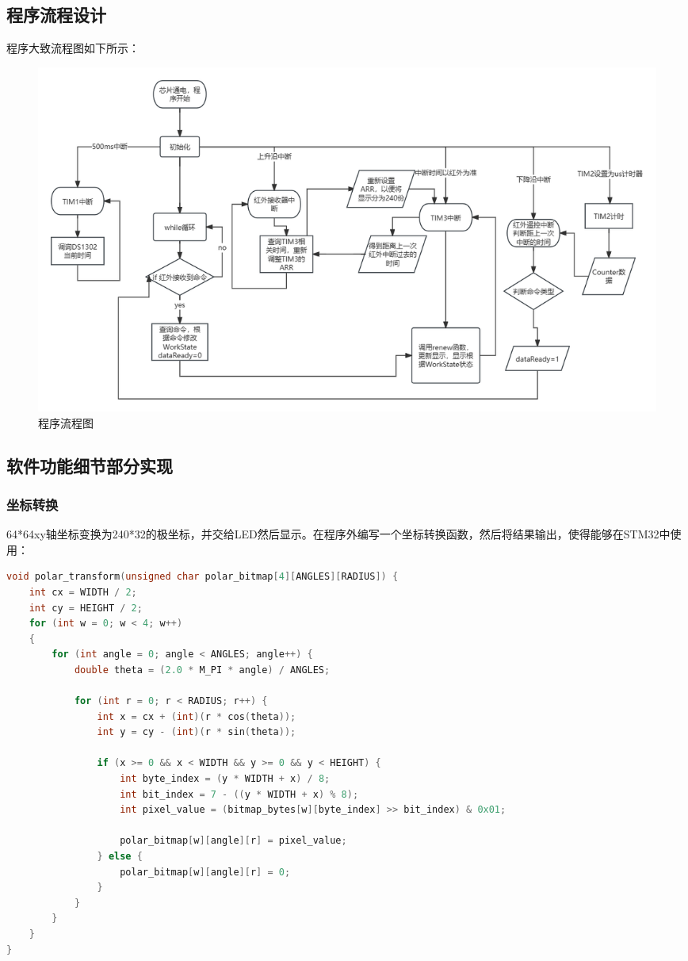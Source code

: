 \documentclass{article}
\begin{document}
\subsection{程序流程设计}
程序大致流程图如下所示：
\begin{figure}[H]
    \centering
    \includegraphics[width=0.9\linewidth]{assets/未命名文件.png}
    \caption{程序流程图}
\end{figure}
\subsection{软件功能细节部分实现}
\subsubsection{坐标转换}
64*64xy轴坐标变换为240*32的极坐标，并交给LED然后显示。在程序外编写一个坐标转换函数，然后将结果输出，使得能够在STM32中使用：
\begin{multicols}{2}
\begin{lstlisting}[language=c]
void polar_transform(unsigned char polar_bitmap[4][ANGLES][RADIUS]) {
    int cx = WIDTH / 2;
    int cy = HEIGHT / 2;
    for (int w = 0; w < 4; w++)
    {
        for (int angle = 0; angle < ANGLES; angle++) {
            double theta = (2.0 * M_PI * angle) / ANGLES;
            
            for (int r = 0; r < RADIUS; r++) {
                int x = cx + (int)(r * cos(theta));
                int y = cy - (int)(r * sin(theta));
                
                if (x >= 0 && x < WIDTH && y >= 0 && y < HEIGHT) {
                    int byte_index = (y * WIDTH + x) / 8;
                    int bit_index = 7 - ((y * WIDTH + x) % 8);
                    int pixel_value = (bitmap_bytes[w][byte_index] >> bit_index) & 0x01;
                    
                    polar_bitmap[w][angle][r] = pixel_value;
                } else {
                    polar_bitmap[w][angle][r] = 0;
                }
            }
        }
    }
}
\end{lstlisting}
\end{multicols}
\end{document}
